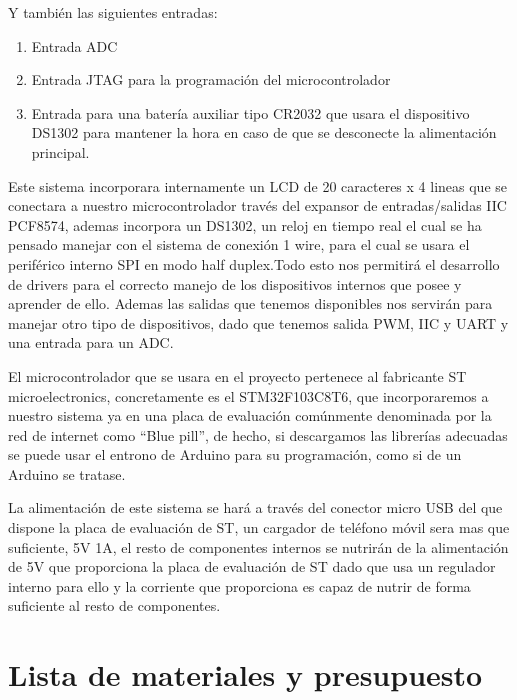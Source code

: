 \documentclass[10pt,a4paper,oneside]{article}
\begin{document}
Y también las siguientes entradas:

\begin{enumerate}
	\item Entrada ADC
	\item Entrada JTAG para la programación del microcontrolador
	\item Entrada para una batería auxiliar tipo CR2032 que usara el dispositivo DS1302 para mantener la hora en caso de que se desconecte la alimentación  principal.
\end{enumerate}

Este sistema incorporara internamente un LCD de 20 caracteres x 4 lineas que se conectara a nuestro microcontrolador través del expansor de entradas/salidas IIC PCF8574, ademas incorpora un DS1302, un reloj en tiempo real el cual se ha pensado manejar con el sistema de conexión 1 wire, para el cual se usara el periférico interno SPI en modo half duplex.Todo esto nos permitirá el desarrollo de drivers para el correcto manejo de los dispositivos internos que posee y aprender de ello. Ademas las salidas que tenemos disponibles nos servirán para manejar otro tipo de dispositivos, dado que tenemos salida PWM, IIC y UART y una entrada para un ADC.

El microcontrolador que se usara en el proyecto pertenece al fabricante ST microelectronics, concretamente es el STM32F103C8T6, que incorporaremos a nuestro sistema ya en una placa de evaluación comúnmente denominada por la red de internet como "`Blue pill"', de hecho, si descargamos las librerías adecuadas se puede usar el entrono de Arduino para su programación, como si de un Arduino se tratase.

La alimentación de este sistema se hará a través del conector micro USB del que dispone la placa de evaluación de ST, un cargador de teléfono móvil sera mas que suficiente, 5V 1A, el resto de componentes internos se nutrirán de la alimentación de 5V que proporciona la placa de evaluación de ST dado que usa un regulador interno para ello y la corriente que proporciona es capaz de nutrir de forma suficiente al resto de componentes.

\vspace{0.5cm}

\section{Lista de materiales y presupuesto}
\end{document}
